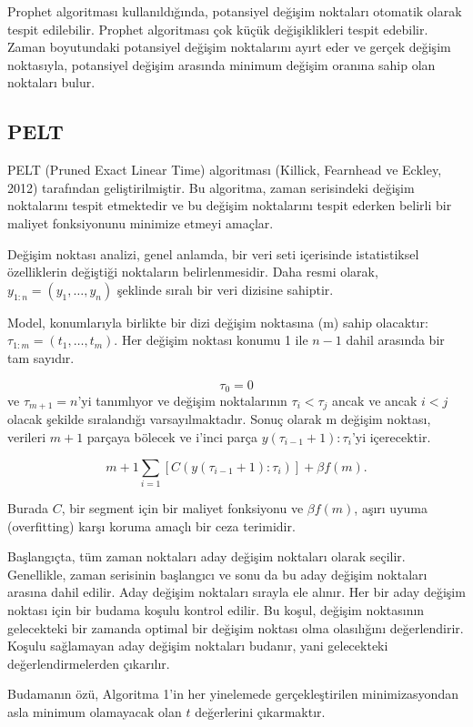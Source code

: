 \documentclass[12pt,twoside]{deuthesis}
\begin{document}
Prophet algoritması kullanıldığında, potansiyel değişim noktaları otomatik olarak tespit edilebilir. Prophet algoritması çok küçük değişiklikleri tespit edebilir. Zaman boyutundaki potansiyel değişim noktalarını ayırt eder ve gerçek değişim noktasıyla, potansiyel değişim arasında minimum değişim oranına sahip olan noktaları bulur.

\subsection{PELT}\label{pelt}

PELT (Pruned Exact Linear Time) algoritması (Killick, Fearnhead ve Eckley, 2012) tarafından geliştirilmiştir. Bu algoritma, zaman serisindeki değişim noktalarını tespit etmektedir ve bu değişim noktalarını tespit ederken belirli bir maliyet fonksiyonunu minimize etmeyi amaçlar.

Değişim noktası analizi, genel anlamda, bir veri seti içerisinde istatistiksel özelliklerin değiştiği noktaların belirlenmesidir. Daha resmi olarak, \(y_{1:n} = (y_1, \ldots, y_n)\) şeklinde sıralı bir veri dizisine sahiptir.

Model, konumlarıyla birlikte bir dizi değişim noktasına (m) sahip olacaktır: \(\tau_{1:m} = (t_1, \ldots, t_m)\). Her değişim noktası konumu 1 ile \(n - 1\) dahil arasında bir tam sayıdır.

\[ \tau_0 = 0 \] ve \(\tau_{m+1} = n\)'yi tanımlıyor ve değişim noktalarının \(\tau_i < \tau_j\) ancak ve ancak \(i < j\) olacak şekilde sıralandığı varsayılmaktadır. Sonuç olarak m değişim noktası, verileri \(m + 1\) parçaya bölecek ve i'inci parça \(y(\tau_{i-1}+1):\tau_i\)'yi içerecektir.

\[ m+1 \sum_{i=1} [C(y(\tau_{i-1}+1):\tau_i)] + \beta f (m). \]

Burada \(C\), bir segment için bir maliyet fonksiyonu ve \(\beta f(m)\), aşırı uyuma (overfitting) karşı koruma amaçlı bir ceza terimidir.

Başlangıçta, tüm zaman noktaları aday değişim noktaları olarak seçilir. Genellikle, zaman serisinin başlangıcı ve sonu da bu aday değişim noktaları arasına dahil edilir. Aday değişim noktaları sırayla ele alınır. Her bir aday değişim noktası için bir budama koşulu kontrol edilir. Bu koşul, değişim noktasının gelecekteki bir zamanda optimal bir değişim noktası olma olasılığını değerlendirir. Koşulu sağlamayan aday değişim noktaları budanır, yani gelecekteki değerlendirmelerden çıkarılır.

Budamanın özü, Algoritma 1'in her yinelemede gerçekleştirilen minimizasyondan asla minimum olamayacak olan \(t\) değerlerini çıkarmaktır.
\end{document}
